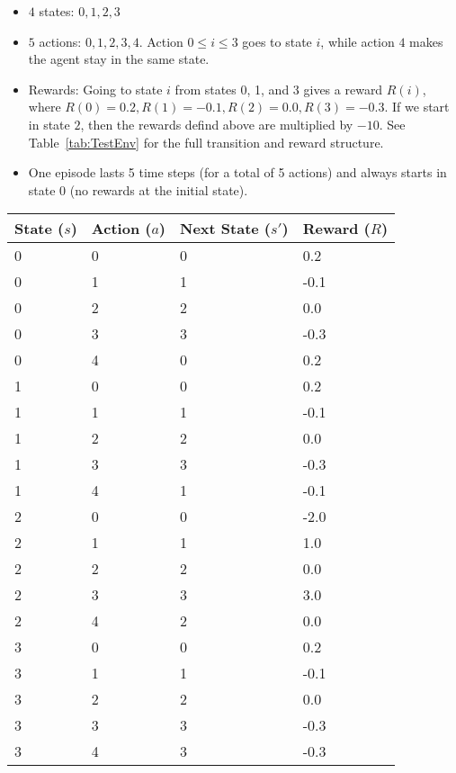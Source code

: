 \documentclass{article}
\begin{document}
\begin{itemize}
	\item $ 4 $ states: $ 0, 1, 2, 3 $
	\item $ 5 $ actions: $ 0, 1, 2, 3, 4 $. Action $ 0 \leq i \leq 3 $ goes to state $ i $, while action $ 4 $ makes the agent stay in the same state.
	\item Rewards: Going to state $ i $ from states 0, 1, and 3 gives a reward $R(i) $, where $R(0) = 0.2, R(1) = -0.1, R(2) = 0.0, R(3) = -0.3 $. If we start in state $ 2 $, then the rewards defind above are multiplied by $ - 10 $.  See Table~\ref{tab:TestEnv} for the full transition and reward structure. 
	\item One episode lasts 5 time steps (for a total of 5 actions) and always starts in state $ 0 $ (no rewards at the initial state).        
\end{itemize}

\begin{center}
	\begin{tabular}{ | l | l | l | l |}  
		\hline
		State ($s$) & Action ($a$) & Next State ($s'$) & Reward ($R$) \\ \hline
		0 & 0 & 0 & 0.2    \\ \hline
		0 & 1 & 1 & -0.1   \\ \hline
		0 & 2 & 2 & 0.0 \\ \hline
		0 & 3 & 3 & -0.3 \\ \hline
		0 & 4 & 0 & 0.2 \\ \hline
		1 & 0 & 0 & 0.2    \\ \hline
		1 & 1 & 1 & -0.1   \\ \hline
		1 & 2 & 2 & 0.0 \\ \hline
		1 & 3 & 3 & -0.3 \\ \hline
		1 & 4 & 1 & -0.1 \\ \hline
		2 & 0 & 0 & -2.0    \\ \hline
		2 & 1 & 1 & 1.0   \\ \hline
		2 & 2 & 2 & 0.0 \\ \hline
		2 & 3 & 3 & 3.0 \\ \hline
		2 & 4 & 2 & 0.0 \\ \hline
		3 & 0 & 0 & 0.2    \\ \hline
		3 & 1 & 1 & -0.1   \\ \hline
		3 & 2 & 2 & 0.0 \\ \hline
		3 & 3 & 3 & -0.3 \\ \hline
		3 & 4 & 3 & -0.3 \\ \hline    
	\end{tabular}
	 \label{tab:TestEnv} 
\end{center}
\end{document}

